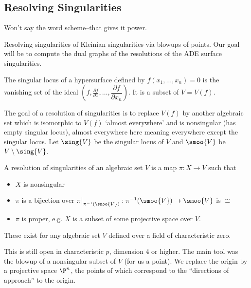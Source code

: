 \subsection{Resolving Singularities}

Won't say the word scheme--that gives it power.

Resolving singularities of Kleinian singularities via blowups of points. Our goal will be to compute the dual graphs of the resolutions of the ADE surface singularities. 


\begin{dfn}
The singular locus of a hypersurface defined by $f(x_1,\ldots,x_n)=0$ is the vanishing set of the ideal $(f, \frac{\partial f}{\partial x}, \ldots, \dfrac{\partial f}{\partial x_n})$. It is a subset of $V=V(f)$. 
\end{dfn}



The goal of a resolution of singularities is to replace $V(f)$ by another algebraic set which is isomorphic to $V(f)$ `almost everywhere' and is nonsingular (has empty singular locus), almost everywhere here meaning everywhere except the singular locus. Let $\sing{V}$ be the singular locus of $V$ and $\smoo{V}$ be $V \setminus \sing{V}$. 


\begin{dfn}
A resolution of singularities of an algebraic set $V$ is a map $\pi: X \to V$ such that 
	\begin{itemize}
	\item $X$ is nonsingular
	\item $\pi$ is a bijection over $\pi\big|_{\pi^{-1}(\smoo{V})}: \pi^{-1}(\smoo{V}) \to \smoo{V}$ is $\cong$
	\item $\pi$ is proper, e.g. $X$ is a subset of some projective space over $V$. 
	\end{itemize}
\end{dfn}


\begin{thm}[Hironaka, 1964]
These exist for any algebraic set $V$ defined over a field of characteristic zero. 
\end{thm}


This is still open in characteristic $p$, dimension 4 or higher. The main tool was the blowup of a nonsingular subset of $V$ (for us a point). We replace the origin by a projective space $\P^n$, the points of which correspond to the ``directions of approach'' to the origin. 



